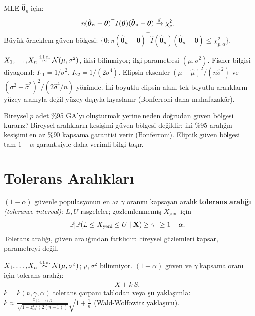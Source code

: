 \begin{teorem}\label{thm:asimptotik_bolge}
MLE $\hat{\boldsymbol\theta}_n$ için:
\[
  n(\hat{\boldsymbol\theta}_n-\boldsymbol\theta)^\top I(\boldsymbol\theta) (\hat{\boldsymbol\theta}_n-\boldsymbol\theta) \xrightarrow{d} \chi^2_p.
\]
Büyük örneklem güven bölgesi: $\{\boldsymbol\theta: n(\hat{\boldsymbol\theta}_n-\boldsymbol\theta)^\top \hat{I}(\hat{\boldsymbol\theta}_n)(\hat{\boldsymbol\theta}_n-\boldsymbol\theta)\leq\chi^2_{p,\alpha}\}$.
\end{teorem}

\begin{ornek}
$X_1,\ldots,X_n\overset{\text{i.i.d.}}{\sim}\mathcal{N}(\mu,\sigma^2)$, ikisi bilinmiyor; ilgi parametresi $(\mu,\sigma^2)$. Fisher bilgisi diyagonal: $I_{11}=1/\sigma^2$, $I_{22}=1/(2\sigma^4)$. Elipsin eksenler $(\mu-\hat\mu)^2/(n\hat\sigma^2)$ ve $(\sigma^2-\hat\sigma^2)^2/(2\hat\sigma^4/n)$ yönünde. İki boyutlu elipsin alanı tek boyutlu aralıkların yüzey alanıyla değil yüzey dışıyla kıyaslanır (Bonferroni daha muhafazakâr).
\end{ornek}

\begin{kritiksorgu}
Bireysel $p$ adet \%95 GA'yı oluşturmak yerine neden doğrudan güven bölgesi kurarız? Bireysel aralıkların kesişimi güven bölgesi değildir: iki \%95 aralığın kesişimi en az \%90 kapsama garantisi verir (Bonferroni). Eliptik güven bölgesi tam $1-\alpha$ garantisiyle daha verimli bilgi taşır.
\end{kritiksorgu}

\section{Tolerans Aralıkları}
\label{sec:tolerans_aralik}

\begin{tanim}\label{def:tolerans_aralik}
$(1-\alpha)$ güvenle popülasyonun en az $\gamma$ oranını kapsayan aralık \textbf{tolerans aralığı} \emph{(tolerance interval)}: $L,U$ rasgeleler; gözlemlenmemiş $X_{\text{yeni}}$ için
\[
  \mathbb{P}\!\bigl[\mathbb{P}(L\leq X_{\text{yeni}}\leq U\mid\mathbf{X})\geq\gamma\bigr]\geq1-\alpha.
\]
Tolerans aralığı, güven aralığından farklıdır: bireysel gözlemleri kapsar, parametreyi değil.
\end{tanim}

\begin{teorem}\label{thm:normal_tolerans}
$X_1,\ldots,X_n\overset{\text{i.i.d.}}{\sim}\mathcal{N}(\mu,\sigma^2)$; $\mu,\sigma^2$ bilinmiyor. $(1-\alpha)$ güven ve $\gamma$ kapsama oranı için tolerans aralığı:
\[
  \bar{X} \pm k\,S,
\]
$k = k(n,\gamma,\alpha)$ tolerans çarpanı tablodan veya şu yaklaşımla: $k\approx\frac{z_{(1-\gamma)/2}}{\sqrt{1-z_\alpha^2/(2(n-1))}}\sqrt{1+\frac{1}{n}}$ (Wald-Wolfowitz yaklaşımı).
\end{teorem}

